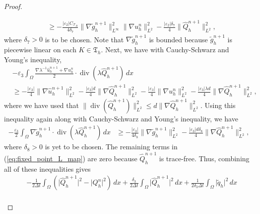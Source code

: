 \documentclass[10pt,letterpaper]{amsart}
\newcommand{\CTR}{C_{\mathcal{T}_R}}
\theoremstyle{definition}{\newtheorem{definition}[lemma]{Definition}}
\theoremstyle{note}{\newtheorem{claim}{Claim}[section]
\newtheorem*{claim*}{Claim}}
\numberwithin{equation}{section}
\begin{document}
\begin{proof}
\begin{itemize}
\begin{equation}
\begin{split}
              &\ge -\frac{\lvert\varepsilon_2\rvert\CTR}{4\delta_7}\|\nabla\tilde g_h^{n+1}\|_{L^\infty}^2\|\nabla u_h^n\|_{L^2}^2 - \frac{\lvert\varepsilon_2\rvert\delta_7}{4}\|\widehat{Q}_h^{n+1}\|_{L^2}^2,
        \end{split}
    \end{equation}
    where $\delta_7>0$ is to be chosen.
    Note that $\nabla\tilde g_h^{n+1}$ is bounded because $\tilde g_h^{n+1}$ is piecewise linear on each $K\in\mathfrak{T}_h$. Next, we have with Cauchy-Schwarz and Young's inequality,
    \begin{equation}
        \begin{split}
            &-\varepsilon_3\int_\Omega \frac{\nabla\lambda^{-1}\widehat{u}_h^{n+1}+\nabla u_h^n}{2}\cdot\operatorname{div}(\lambda\widehat{Q}_h^{n+1})\, dx\\ 
            &\ge -\frac{\lvert\varepsilon_3\rvert}{4}\|\nabla\widehat{u}_h^{n+1}\|_{L^2}^2 - \frac{\lvert\varepsilon_3\rvert d}{4}\|\nabla \widehat{Q}_h^{n+1}\|_{L^2}^2 - \frac{\lvert \varepsilon_3\rvert}{4}\|\nabla u_h^n\|_{L^2}^2 - \frac{\lvert\varepsilon_3\rvert\lambda d}{4}\|\nabla \widehat{Q}_h^{n+1}\|_{L^2}^2,
        \end{split}
    \end{equation}
    where we have used that $\|\operatorname{div}(\widehat{Q}_h^{n+1})\|_{L^2}^2 \le d\|\nabla\widehat{Q}_h^{n+1}\|_{L^2}^2$. Using this inequality again along with Cauchy-Schwarz and Young's inequality, we have
    \begin{equation}
        \begin{split}
            -\frac{\varepsilon_3}{2} \int_\Omega \nabla\tilde g_h^{n+1}\cdot\operatorname{div}(\lambda\widehat{Q}_h^{n+1})\, dx &\ge -\frac{\lvert\varepsilon_3\rvert}{4\delta_8}\|\nabla\tilde g_h^{n+1}\|_{L^2}^2 - \frac{\lvert\varepsilon_3\rvert d\delta_8}{4}\|\nabla\widehat{Q}_h^{n+1}\|_{L^2}^2,
        \end{split}
    \end{equation}
    where $\delta_8>0$ is yet to be chosen. The remaining terms in (\ref{eq:fixed_point_L_map}) are zero because $\widehat{Q}_h^{n+1}$ is trace-free. Thus, combining all of these inequalities gives
    \begin{equation}
        \begin{split}
            &-\frac{1}{2\Delta t}\int_\Omega \left(\lvert\widehat{Q}_h^{n+1}\rvert^2 - \lvert Q_h^n\rvert^2\right)\, dx + \frac{\delta_3}{2\Delta t}\int_\Omega \lvert\widehat{Q}_h^{n+1}\rvert^2\, dx + \frac{1}{2\delta_3 \Delta t}\int_\Omega \lvert \tilde q_h\rvert^2\, dx\\

\end{split}
\end{equation}
\end{itemize}
\end{proof}
\end{document}
